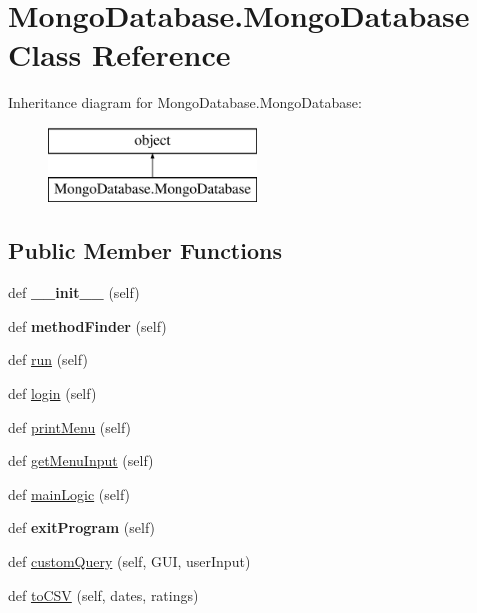 \hypertarget{class_mongo_database_1_1_mongo_database}{}\section{Mongo\+Database.\+Mongo\+Database Class Reference}
\label{class_mongo_database_1_1_mongo_database}
Inheritance diagram for Mongo\+Database.\+Mongo\+Database\+:\begin{figure}[H]
\begin{center}
\leavevmode
\includegraphics[height=2.000000cm]{class_mongo_database_1_1_mongo_database}
\end{center}
\end{figure}
\subsection*{Public Member Functions}
\begin{DoxyCompactItemize}
\item 
\hypertarget{class_mongo_database_1_1_mongo_database_a02dc685b883d5747c2a8329d4d4c67b5}{}\label{class_mongo_database_1_1_mongo_database_a02dc685b883d5747c2a8329d4d4c67b5} 
def {\bfseries \+\_\+\+\_\+init\+\_\+\+\_\+} (self)
\item 
\hypertarget{class_mongo_database_1_1_mongo_database_a6a22d9c25edbbd88115bbc64889f854d}{}\label{class_mongo_database_1_1_mongo_database_a6a22d9c25edbbd88115bbc64889f854d} 
def {\bfseries method\+Finder} (self)
\item 
def \hyperlink{class_mongo_database_1_1_mongo_database_afdd3078ad8bb851bab945b1b477f1529}{run} (self)
\item 
def \hyperlink{class_mongo_database_1_1_mongo_database_a54df0dccd3550bc038fa246ee0f97a15}{login} (self)
\item 
def \hyperlink{class_mongo_database_1_1_mongo_database_a2eb4c5b675b39a871dfdf03458376363}{print\+Menu} (self)
\item 
def \hyperlink{class_mongo_database_1_1_mongo_database_ab5d6d51b956790d3804e4c566ae40cfe}{get\+Menu\+Input} (self)
\item 
def \hyperlink{class_mongo_database_1_1_mongo_database_a123d046fd01db4d2b342289a972e8e31}{main\+Logic} (self)
\item 
\hypertarget{class_mongo_database_1_1_mongo_database_a80a8491e446682c7e420fd1270c8cfe2}{}\label{class_mongo_database_1_1_mongo_database_a80a8491e446682c7e420fd1270c8cfe2} 
def {\bfseries exit\+Program} (self)
\item 
def \hyperlink{class_mongo_database_1_1_mongo_database_af1be85a82838d6e46f181af707892606}{custom\+Query} (self, G\+UI, user\+Input)
\item 
def \hyperlink{class_mongo_database_1_1_mongo_database_a27e20258620a2a1953a460e7c7aa3e14}{to\+C\+SV} (self, dates, ratings)
\end{DoxyCompactItemize}
